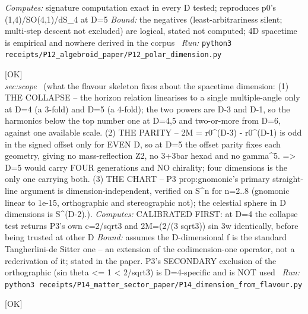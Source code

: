 \begin{description}
\emph{Computes:} signature computation exact in every D tested; reproduces p0's (1,4)/SO(4,1)/dS\_4 at D=5
 \emph{Bound:} the negatives (least-arbitrariness silent; multi-step descent not excluded) are logical, stated not computed; 4D spacetime is empirical and nowhere derived in the corpus
\ \emph{Run:} \texttt{python3 receipts/P12\_algebroid\_paper/P12\_polar\_dimension.py}
\item[\label{rcpt:P14_dimension_from_flavour}\texttt{P14\_dimension\_from\_flavour}]\hfill\textsf{[OK]}\\
\textit{sec:scope} \ (what the flavour skeleton fixes about the spacetime dimension: (1) THE COLLAPSE -- the horizon relation linearises to a single multiple-angle only at D=4 (a 3-fold) and D=5 (a 4-fold); the two powers are D-3 and D-1, so the harmonics below the top number one at D=4,5 and two-or-more from D=6, against one available scale. (2) THE PARITY -- 2M = r0\textasciicircum{}(D-3) - r0\textasciicircum{}(D-1) is odd in the signed offset only for EVEN D, so at D=5 the offset parity fixes each geometry, giving no mass-reflection Z2, no 3+3bar hexad and no gamma\textasciicircum{}5. => D=5 would carry FOUR generations and NO chirality; four dimensions is the only one carrying both. (3) THE CHART -- P3 prop:gnomonic's primary straight-line argument is dimension-independent, verified on S\textasciicircum{}n for n=2..8 (gnomonic linear to 1e-15, orthographic and stereographic not); the celestial sphere in D dimensions is S\textasciicircum{}(D-2).). 
\emph{Computes:} CALIBRATED FIRST: at D=4 the collapse test returns P3's own c=2/sqrt3 and 2M=(2/(3 sqrt3)) sin 3w identically, before being trusted at other D
 \emph{Bound:} assumes the D-dimensional f is the standard Tangherlini-de Sitter one -- an extension of the codimension-one operator, not a rederivation of it; stated in the paper. P3's SECONDARY exclusion of the orthographic (sin theta <= 1 < 2/sqrt3) is D=4-specific and is NOT used
\ \emph{Run:} \texttt{python3 receipts/P14\_matter\_sector\_paper/P14\_dimension\_from\_flavour.py}
\item[\label{rcpt:P14_the_flat_bundle_cannot_carry_a_force}\texttt{P14\_the\_flat\_bundle\_cannot\_carry\_a\_force}]\hfill\textsf{[OK]}\\

\end{description}
